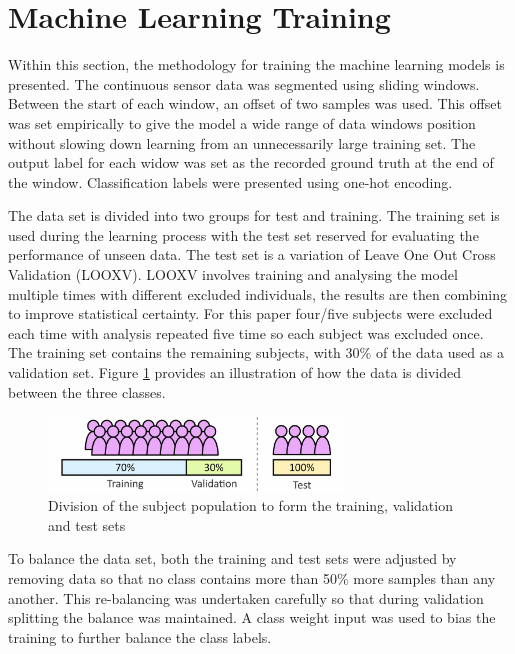 \documentclass[sensors,article,submit,moreauthors,pdftex]{Definitions/mdpi}
\begin{document}
\section{Machine Learning Training}
\label{sec:machine_Learning}
Within this section, the methodology for training the machine learning models is presented. The continuous sensor data was segmented using sliding windows. Between the start of each window, an offset of two samples was used. This offset was set empirically to give the model a wide range of data windows position without slowing down learning from an unnecessarily large training set. The output label for each widow was set as the recorded ground truth at the end of the window. Classification labels were presented using one-hot encoding.

The data set is divided into two groups for test and training. The training set is used during the learning process with the test set reserved for evaluating the performance of unseen data. The test set is a variation of Leave One Out Cross Validation (LOOXV). LOOXV involves training and analysing the model multiple times with different excluded individuals, the results are then combining to improve statistical certainty. For this paper four/five subjects were excluded each time with analysis repeated five time so each subject was excluded once. The training set contains the remaining subjects, with 30\% of the data used as a validation set. Figure \ref{fig:test_training_split} provides an illustration of how the data is divided between the three classes.

\begin{figure}[!hbt]
    \centering
    \includegraphics[width=0.7\textwidth]{Figures/test_train_split.jpg}
    \caption{Division of the subject population to form the training, validation and test sets}
    \label{fig:test_training_split}
\end{figure}

To balance the data set, both the training and test sets were adjusted by removing data so that no class contains more than 50\% more samples than any another. This re-balancing was undertaken carefully so that during validation splitting the balance was maintained. A class weight input was used to bias the training to further balance the class labels.
\end{document}

